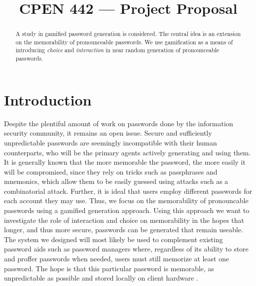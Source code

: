 \documentclass[conference]{IEEEtran}
\begin{document}
\title{CPEN 442 --- Project Proposal}


\author{
\and
{}
}


\maketitle

\begin{abstract}
A study in gamified password generation is considered. The central idea is an extension on the memorability of pronounceable passwords. We use gamification as a means of introducing \emph{choice} and \emph{interaction} in near random generation of pronounceable passwords.
\end{abstract}

\section{Introduction}
Despite the plentiful amount of work on passwords done by the information security community, it remains an open issue. Secure and sufficiently unpredictable passwords are seemingly incompatible with their human counterparts, who will be the primary agents actively generating and using them. It is generally known that the more memorable the password, the more easily it will be compromised, since they rely on tricks such as passphrases and mnemonics, which allow them to be easily guessed using attacks such as a combinatorial attack. Further, it is ideal that users employ different passwords for each account they may use. Thus, we focus on the memorability of pronouncable passwords using a gamified generation approach. Using this approach we want to investigate the role of interaction and choice on memorability in the hopes that longer, and thus more secure, passwords can be generated that remain useable. The system we designed will most likely be used to complement existing password aids such as password managers where, regardless of its ability to store and proffer passwords when needed, users must still memorize at least one password. The hope is that this particular password is memorable, as unpredictable as possible and stored locally on client hardware
.
\end{document}
